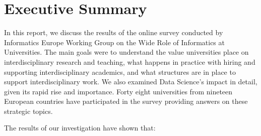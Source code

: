 \section*{Executive Summary}
In this report, we  discuss the results of the online survey conducted by Informatics Europe Working Group on the Wide Role of Informatics at Universities. The main goals were to understand the value universities place on interdisciplinary research and teaching, what happens in practice with hiring and supporting interdisciplinary academics, and what structures are in place to support interdisciplinary work. We also examined Data Science's impact in detail, given its rapid rise and importance. Forty eight universities from nineteen European countries have participated in the survey providing answers on these strategic topics. 

The results of our investigation have shown that: 
